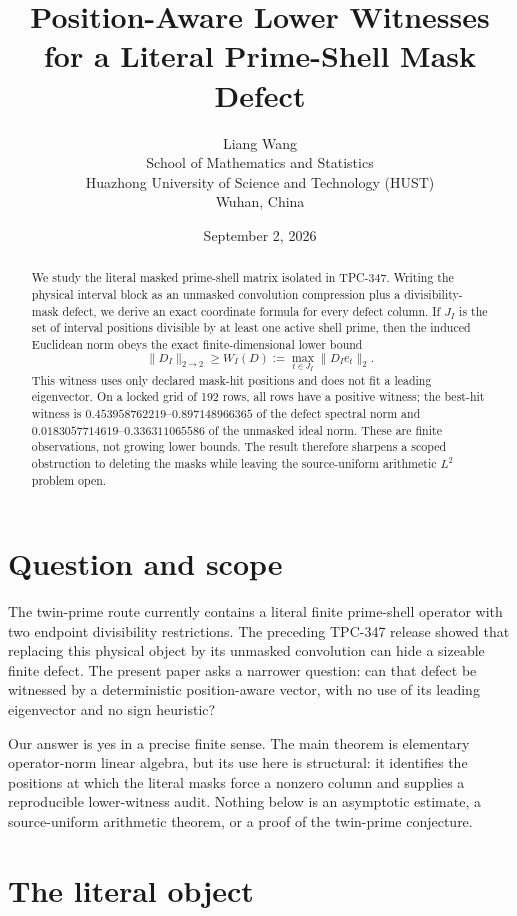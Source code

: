 \documentclass[10pt]{article}
\title{Position-Aware Lower Witnesses\\
       for a Literal Prime-Shell Mask Defect}
\author{Liang Wang\\
School of Mathematics and Statistics\\
Huazhong University of Science and Technology (HUST)\\
Wuhan, China}
\date{September 2, 2026}
\begin{document}
\maketitle

\begin{abstract}
We study the literal masked prime-shell matrix isolated in TPC-347.  Writing
the physical interval block as an unmasked convolution compression plus a
divisibility-mask defect, we derive an exact coordinate formula for every
defect column.  If $J_I$ is the set of interval positions divisible by at
least one active shell prime, then the induced Euclidean norm obeys the exact
finite-dimensional lower bound
\[
 \|D_I\|_{2\to2}\geq W_I(D):=
 \max_{t\in J_I}\|D_I e_t\|_2.
\]
This witness uses only declared mask-hit positions and does not fit a leading
eigenvector.  On a locked grid of 192 rows, all rows have a positive witness;
the best-hit witness is $0.453958762219$--$0.897148966365$ of the defect
spectral norm and $0.0183057714619$--$0.336311065586$ of the unmasked ideal
norm.  These are finite observations, not growing lower bounds.  The result
therefore sharpens a scoped obstruction to deleting the masks while leaving
the source-uniform arithmetic $L^2$ problem open.
\end{abstract}

\section{Question and scope}

The twin-prime route currently contains a literal finite prime-shell operator
with two endpoint divisibility restrictions.  The preceding TPC-347 release
showed that replacing this physical object by its unmasked convolution can
hide a sizeable finite defect.  The present paper asks a narrower question:
can that defect be witnessed by a deterministic position-aware vector, with no
use of its leading eigenvector and no sign heuristic?

Our answer is yes in a precise finite sense.  The main theorem is elementary
operator-norm linear algebra, but its use here is structural: it identifies
the positions at which the literal masks force a nonzero column and supplies
a reproducible lower-witness audit.  Nothing below is an asymptotic estimate,
a source-uniform arithmetic theorem, or a proof of the twin-prime conjecture.

\section{The literal object}
\end{document}
